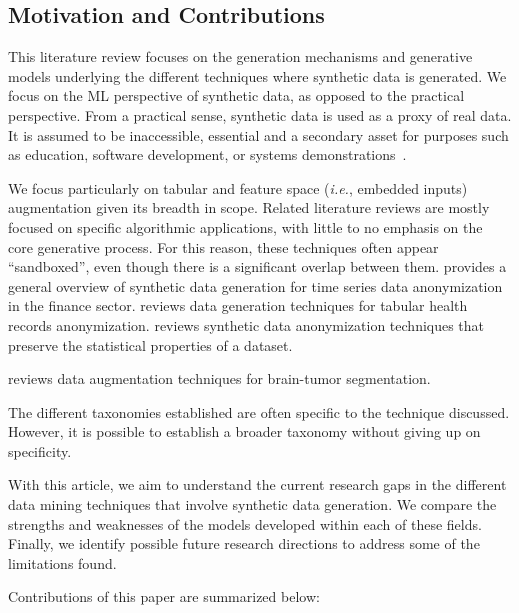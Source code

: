 \documentclass[parskip=full]{scrartcl}
\begin{document}

\subsection{Motivation and Contributions}

This literature review focuses on the generation mechanisms and generative
models underlying the different techniques where synthetic data is generated.
We focus on the ML perspective of synthetic data, as opposed to the practical
perspective. From a practical sense, synthetic data is used as a proxy of real
data. It is assumed to be inaccessible, essential and a secondary asset for
purposes such as education, software development, or systems
demonstrations~\cite{mannino2019real}. 


We focus particularly on tabular and feature space (\textit{i.e.}, embedded
inputs) augmentation given its breadth in scope. Related literature reviews
are mostly focused on specific algorithmic applications, with little to no
emphasis on the core generative process. For this reason, these techniques
often appear ``sandboxed'', even though there is a significant overlap between
them. \citet{assefa2020generating} provides a general overview of
synthetic data generation for time series data anonymization in the finance
sector. \citet{hernandez2022synthetic} reviews data generation techniques for
tabular health records anonymization. \citet{raghunathan2021synthetic} reviews
synthetic data anonymization techniques that preserve the statistical
properties of a dataset.

\citet{nalepa2019data} reviews data augmentation techniques for brain-tumor
segmentation. 

The different taxonomies established are often specific to the technique
discussed. However, it is possible to establish a broader taxonomy without
giving up on specificity.

With this article, we aim to understand the current research gaps in the
different data mining techniques that involve synthetic data generation. We
compare the strengths and weaknesses of the models developed within each of
these fields. Finally, we identify possible future research directions to
address some of the limitations found.

Contributions of this paper are summarized below:
\end{document}
